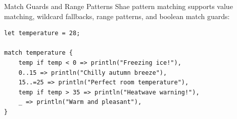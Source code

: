 \begin{syntaxbox}{Match Guards and Range Patterns}
Shae pattern matching supports value matching, wildcard fallbacks, range patterns, and boolean match guards:
\begin{lstlisting}[language=shaelang]
let temperature = 28;

match temperature {
    temp if temp < 0 => println("Freezing ice!"),
    0..15 => println("Chilly autumn breeze"),
    15..=25 => println("Perfect room temperature"),
    temp if temp > 35 => println("Heatwave warning!"),
    _ => println("Warm and pleasant"),
}
\end{lstlisting}
\end{syntaxbox}
